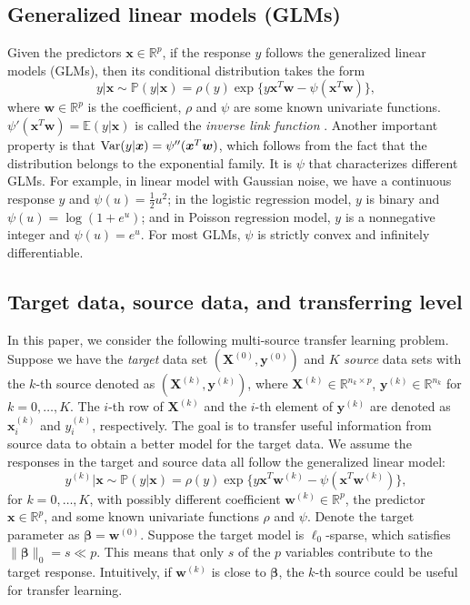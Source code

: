 \documentclass[12pt]{article}
\newcommand{\tp}{\mathbb{P}}
\newcommand{\te}{\mathbb{E}}
\newcommand{\var}{\textup{Var}}
\newcommand{\zeronorm}[1]{\|#1\|_{0}}
\newcommand{\bbeta}{\bm{\beta}}
\newcommand{\bx}{\bm{x}}
\newcommand{\bw}{\bm{w}}
\newcommand{\bwk}[1]{\bm{w}^{(#1)}}
\newcommand{\by}{\bm{y}}
\newcommand{\bX}{\bm{X}}
\newcommand{\<}{\langle}
\renewcommand{\>}{\rangle}
\begin{document}
\subsection{Generalized linear models (GLMs)}\label{subsec:glm}
Given the predictors $\bx \in \mathbb{R}^p$, if the response $y$ follows the generalized linear models (GLMs), then its conditional distribution takes the form
\begin{equation}\label{eq: glm def}
	y|\bx \sim \tp(y|\bx) = \rho(y)\exp\{y\bx^T\bw - \psi(\bx^T\bw)\},
\end{equation}
where $\bw \in \mathbb{R}^p$ is the coefficient, $\rho$ and $\psi$ are some known univariate functions. $\psi'(\bx^T\bw) = \te(y|\bx)$ is called the \textit{inverse link function} \citep{mccullagh1989generalized}. Another important property is that $\var(y|\bx)=\psi''(\bx^T\bw)$, which follows from the fact that the distribution belongs to the exponential family. It is $\psi$ that characterizes different GLMs. For example, in linear model with Gaussian noise, we have a continuous response $y$ and $\psi(u)=\frac{1}{2}u^2$; in the logistic regression model, $y$ is binary and $\psi(u)=\log(1+e^u)$; and in Poisson regression model, $y$ is a nonnegative integer and $\psi(u)=e^u$. For most GLMs, $\psi$ is strictly convex and infinitely differentiable.

\subsection{Target data, source data, and transferring level}\label{subsec:target source trasnfer}
In this paper, we consider the following multi-source transfer learning problem. Suppose we have the \textit{target} data set $(\bX^{(0)}, \by^{(0)})$ and $K$ \textit{source} data sets with the $k$-th source denoted as $(\bX^{(k)}, \by^{(k)})$, where $\bX^{(k)} \in \mathbb{R}^{n_k \times p}$, $\by^{(k)} \in \mathbb{R}^{n_k}$ for $k = 0, \ldots, K$. The $i$-th row of $\bX^{(k)}$ and the $i$-th element of $\by^{(k)}$ are denoted as $\bx_{i}^{(k)}$ and $y_{i}^{(k)}$, respectively. The goal is to transfer useful information from source data to obtain a better model for the target data. We assume the responses in the target and source data all follow the generalized linear model:
\begin{equation}\label{eq: glm}
	y^{(k)}|\bx \sim \tp(y|\bx) = \rho(y)\exp\{y\bx^T\bwk{k} - \psi(\bx^T\bwk{k})\},
\end{equation}
for $k = 0, \ldots, K$, with possibly different coefficient $\bwk{k} \in \mathbb{R}^p$, the predictor $\bx \in \mathbb{R}^p$, and some known univariate functions $\rho$ and $\psi$. Denote the target parameter as $\bbeta = \bwk{0}$. Suppose the target model is $\ell_0$-sparse, which satisfies $\zeronorm{\bbeta} =s \ll p$. This means that only $s$ of the $p$ variables contribute to the target response. Intuitively, if $\bwk{k}$ is close to $\bbeta$, the $k$-th source could be useful for transfer learning.
\end{document}
